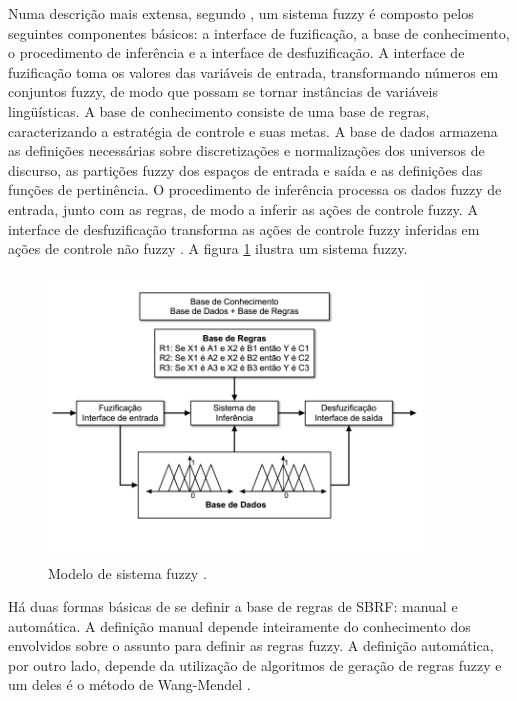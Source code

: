 \documentclass[template.tex]{subfiles}
\begin{document}
Numa descrição mais extensa, segundo \cite{gomide1995conceitos}, um sistema fuzzy é composto pelos seguintes componentes básicos: a interface de fuzificação, a base de conhecimento, o procedimento de inferência e a interface de desfuzificação. A interface de fuzificação toma os valores das variáveis de entrada, transformando números em conjuntos fuzzy, de modo que possam se tornar instâncias de variáveis lingüísticas. A base de conhecimento consiste de uma base de regras, caracterizando a estratégia de controle e suas metas. A base de dados armazena as definições necessárias sobre discretizações e normalizações dos universos de discurso, as partições fuzzy dos espaços de entrada e saída e as definições das funções de pertinência. O procedimento de inferência processa os dados fuzzy de entrada, junto com as regras, de modo a inferir as ações de controle fuzzy. A interface de desfuzificação transforma as ações de controle fuzzy inferidas em ações de controle não fuzzy \cite{gomide1995conceitos}. A figura \ref{fig:sistema_nebuloso} ilustra um sistema fuzzy.

\begin{figure}[H]  
  \caption{Modelo de sistema fuzzy \cite{herrera2008genetic}.}
  \label{fig:sistema_nebuloso}
  \centering
    \includegraphics[width=0.9\textwidth]{sistema_nebuloso}
\end{figure}

Há duas formas básicas de se definir a base de regras de SBRF: manual e automática. A definição manual depende inteiramente do conhecimento dos envolvidos sobre o assunto para definir as regras fuzzy. A definição automática, por outro lado, depende da utilização de algoritmos de geração de regras fuzzy e um deles é o método de Wang-Mendel \cite{wang1992generating}.
\end{document}
